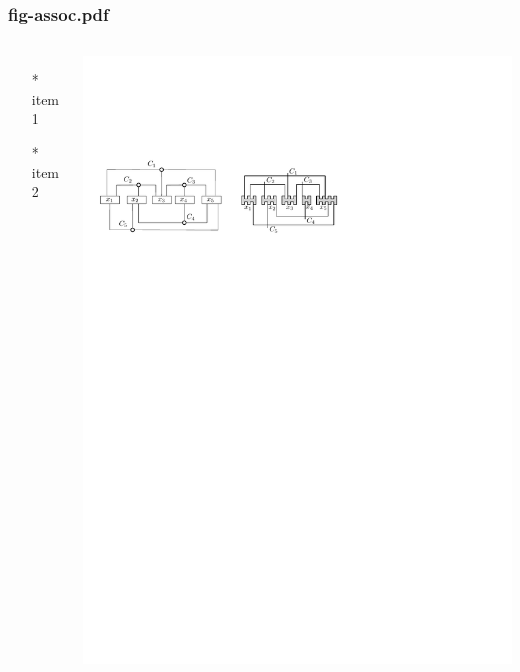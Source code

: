 \begin{frame} \frametitle{fig-assoc.pdf}
    \begin{columns}[c]
        \begin{itemize}
            \item[*] item 1
            \item[*] item 2
        \end{itemize}
        \begin{minipage}{\linewidth}
            \begin{center}
            \includegraphics[width=.9\textwidth]{graphics/fig-assoc.pdf}
            \label{gfx:fig-assoc.pdf}
            \end{center}
        \end{minipage}
    \end{columns}
\end{frame}
